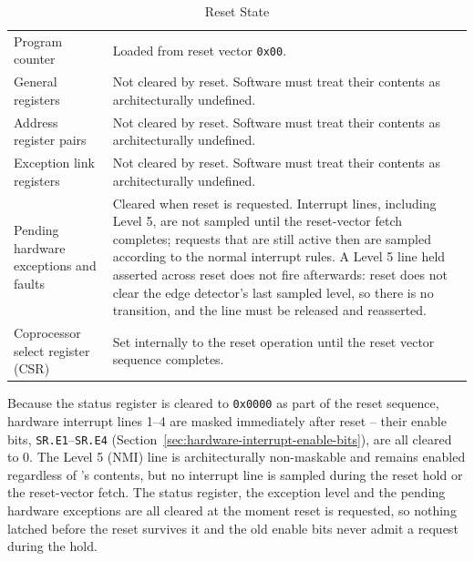 \begin{table}[H]
\begin{tabularx}{\textwidth}{l>{\raggedright\arraybackslash}X}
		Program counter                        & Loaded from reset vector \texttt{0x00}.                                                                                                                                                                                                                                                 \\
		General registers                      & Not cleared by reset. Software must treat their contents as architecturally undefined.                                                                                                                                                                                                  \\
		Address register pairs                 & Not cleared by reset. Software must treat their contents as architecturally undefined.                                                                                                                                                                                                  \\
		Exception link registers               & Not cleared by reset. Software must treat their contents as architecturally undefined.                                                                                                                                                                                                  \\
		Pending hardware exceptions and faults & Cleared when reset is requested. Interrupt lines, including Level 5, are not sampled until the
		reset-vector fetch completes; requests that are still active then are sampled according to the normal interrupt rules. A Level 5 line held asserted across reset does not fire afterwards: reset does not clear the edge detector's last sampled level, so there is no transition, and the line must be released and reasserted. \\
		Coprocessor select register (CSR)      & Set internally to the reset operation until the reset vector sequence completes.                                                                                                                                                                                                        \\
		\bottomrule
	\end{tabularx}
	\caption{Reset State}
	\label{tab:reset-state}
\end{table}

Because the status register is cleared to \texttt{0x0000} as part of the reset sequence, hardware interrupt lines 1--4
are masked immediately after reset -- their enable bits, \texttt{SR.E1}--\texttt{SR.E4}
(Section~\ref{sec:hardware-interrupt-enable-bits}), are all cleared to 0. The Level 5 (NMI) line is architecturally
non-maskable and remains enabled regardless of 's contents, but no interrupt line is sampled during the reset
hold or the reset-vector fetch. The status register, the exception level and the pending hardware exceptions are all
cleared at the moment reset is requested, so nothing latched before the reset survives it and the old enable bits never
admit a request during the hold.

